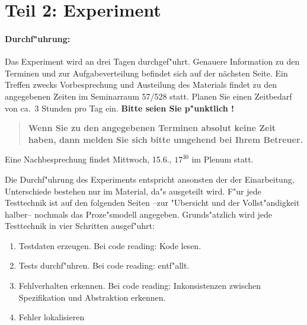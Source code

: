 \newpage
\section*{Teil 2: Experiment}

\paragraph{Durchf"uhrung:} 
Das Experiment wird an drei Tagen durchgef"uhrt.
Genauere Information zu den Terminen und zur Aufgabeverteilung
befindet sich auf der n\"achsten Seite. 
Ein Treffen zwecks Vorbesprechung und Austeilung des Materials findet zu den
angegebenen Zeiten im Seminarraum 57/528 statt. Planen Sie einen Zeitbedarf
von ca.~3 Stunden pro Tag ein. {\bf Bitte seien Sie p"unktlich !}

\begin{quote}
{\bf Wenn Sie zu den angegebenen Terminen absolut keine Zeit haben, dann
melden Sie sich bitte umgehend bei Ihrem Betreuer.}
\end{quote}

\bigskip

Eine Nachbesprechung findet Mittwoch, 15.6., $17^{30}$ im Plenum statt.

\bigskip

Die Durchf"uhrung des Experiments entspricht ansonsten der der Einarbeitung,
Unterschiede bestehen nur im Material, da"s ausgeteilt wird.
F"ur jede Testtechnik ist auf den folgenden Seiten --zur "Ubersicht und
der Vollst"andigkeit halber-- nochmals das Proze"smodell angegeben.
Grunds"atzlich wird jede Testtechnik in vier
Schritten ausgef"uhrt:
\begin{enumerate}
	\item Testdaten erzeugen. Bei code reading: Kode lesen.
	\item Tests durchf"uhren. Bei code reading: entf"allt.
	\item Fehlverhalten erkennen. Bei code reading: Inkonsistenzen
			zwischen Spezifikation und Abstraktion erkennen.
	\item Fehler lokalisieren
\end{enumerate}


\newpage

